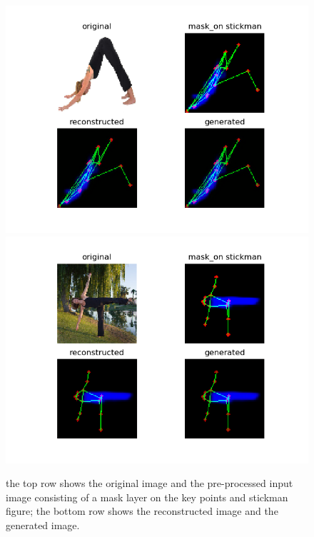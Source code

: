 \documentclass{article}
\begin{document}
\begin{figure}[H]
    \centering
    \includegraphics[scale=0.36]{f5.png}
    \includegraphics[scale=0.36]{f6.png}
    \caption{the top row shows the original image and the pre-processed input image consisting of a mask layer on the key points and stickman figure; the bottom row shows the reconstructed image and the generated image.}
\end{figure}
\end{document}
